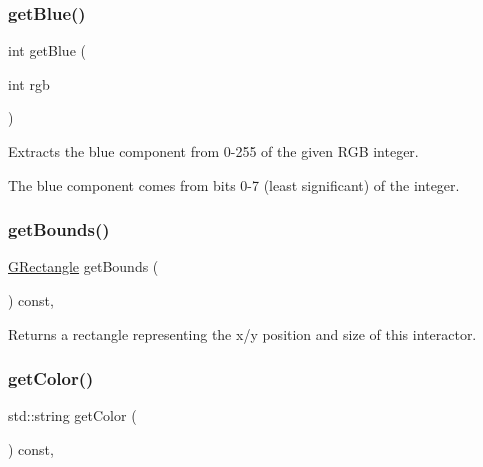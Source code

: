 \mbox{\label{classGCanvas_a9406c01e6961257db37b5dc95945f914}} 
\subsubsection{\texorpdfstring{get\+Blue()}{getBlue()}}
{\footnotesize\ttfamily int get\+Blue (\begin{DoxyParamCaption}\item[{int}]{rgb }\end{DoxyParamCaption})\hspace{0.3cm}{\ttfamily [static]}}



Extracts the blue component from 0-\/255 of the given R\+GB integer. 

The blue component comes from bits 0-\/7 (least significant) of the integer. \mbox{\label{classGInteractor_a29e6ac35a0b48f491a4c88194cc5da3b}} 
\subsubsection{\texorpdfstring{get\+Bounds()}{getBounds()}}
{\footnotesize\ttfamily \mbox{\hyperlink{classGRectangle}{G\+Rectangle}} get\+Bounds (\begin{DoxyParamCaption}{ }\end{DoxyParamCaption}) const\hspace{0.3cm}{\ttfamily [virtual]}, {\ttfamily [inherited]}}



Returns a rectangle representing the x/y position and size of this interactor. 

\mbox{\label{classGInteractor_aa061dfa488c31e18549d64363c1d0e34}} 
\subsubsection{\texorpdfstring{get\+Color()}{getColor()}\hspace{0.1cm}{\footnotesize\ttfamily [1/2]}}
{\footnotesize\ttfamily std\+::string get\+Color (\begin{DoxyParamCaption}{ }\end{DoxyParamCaption}) const\hspace{0.3cm}{\ttfamily [virtual]}, {\ttfamily [inherited]}}



